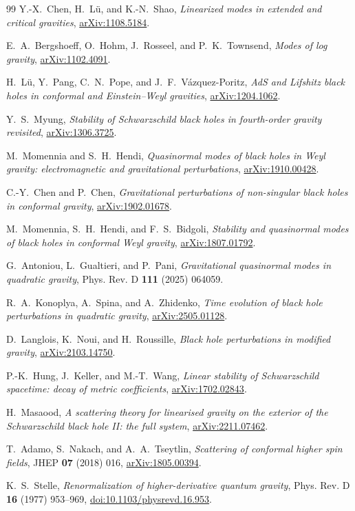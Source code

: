 \documentclass[11pt]{article}
\theoremstyle{definition}
\theoremstyle{remark}
\begin{document}
\begin{thebibliography}{99}
Y.-X.~Chen, H.~L\"u, and K.-N.~Shao,
\emph{Linearized modes in extended and critical gravities},
\href{https://arxiv.org/abs/1108.5184}{arXiv:1108.5184}.

E.~A.~Bergshoeff, O.~Hohm, J.~Rosseel, and P.~K.~Townsend,
\emph{Modes of log gravity},
\href{https://arxiv.org/abs/1102.4091}{arXiv:1102.4091}.

H.~L\"u, Y.~Pang, C.~N.~Pope, and J.~F.~V\'azquez-Poritz,
\emph{AdS and Lifshitz black holes in conformal and Einstein--Weyl
gravities},
\href{https://arxiv.org/abs/1204.1062}{arXiv:1204.1062}.

Y.~S.~Myung,
\emph{Stability of Schwarzschild black holes in fourth-order gravity
revisited},
\href{https://arxiv.org/abs/1306.3725}{arXiv:1306.3725}.

M.~Momennia and S.~H.~Hendi,
\emph{Quasinormal modes of black holes in Weyl gravity: electromagnetic and
gravitational perturbations},
\href{https://arxiv.org/abs/1910.00428}{arXiv:1910.00428}.

C.-Y.~Chen and P.~Chen,
\emph{Gravitational perturbations of non-singular black holes in conformal
gravity},
\href{https://arxiv.org/abs/1902.01678}{arXiv:1902.01678}.

M.~Momennia, S.~H.~Hendi, and F.~S.~Bidgoli,
\emph{Stability and quasinormal modes of black holes in conformal Weyl
gravity},
\href{https://arxiv.org/abs/1807.01792}{arXiv:1807.01792}.

G.~Antoniou, L.~Gualtieri, and P.~Pani,
\emph{Gravitational quasinormal modes in quadratic gravity},
Phys. Rev. D \textbf{111} (2025) 064059.

R.~A.~Konoplya, A.~Spina, and A.~Zhidenko,
\emph{Time evolution of black hole perturbations in quadratic gravity},
\href{https://arxiv.org/abs/2505.01128}{arXiv:2505.01128}.

D.~Langlois, K.~Noui, and H.~Roussille,
\emph{Black hole perturbations in modified gravity},
\href{https://arxiv.org/abs/2103.14750}{arXiv:2103.14750}.

P.-K.~Hung, J.~Keller, and M.-T.~Wang,
\emph{Linear stability of Schwarzschild spacetime: decay of metric
coefficients},
\href{https://arxiv.org/abs/1702.02843}{arXiv:1702.02843}.

H.~Masaood,
\emph{A scattering theory for linearised gravity on the exterior of the
Schwarzschild black hole II: the full system},
\href{https://arxiv.org/abs/2211.07462}{arXiv:2211.07462}.

T.~Adamo, S.~Nakach, and A.~A.~Tseytlin,
\emph{Scattering of conformal higher spin fields},
JHEP \textbf{07} (2018) 016,
\href{https://arxiv.org/abs/1805.00394}{arXiv:1805.00394}.

K.~S.~Stelle,
\emph{Renormalization of higher-derivative quantum gravity},
Phys. Rev. D \textbf{16} (1977) 953--969,
\href{https://doi.org/10.1103/physrevd.16.953}{doi:10.1103/physrevd.16.953}.
\end{thebibliography}
\endgroup
\end{document}
